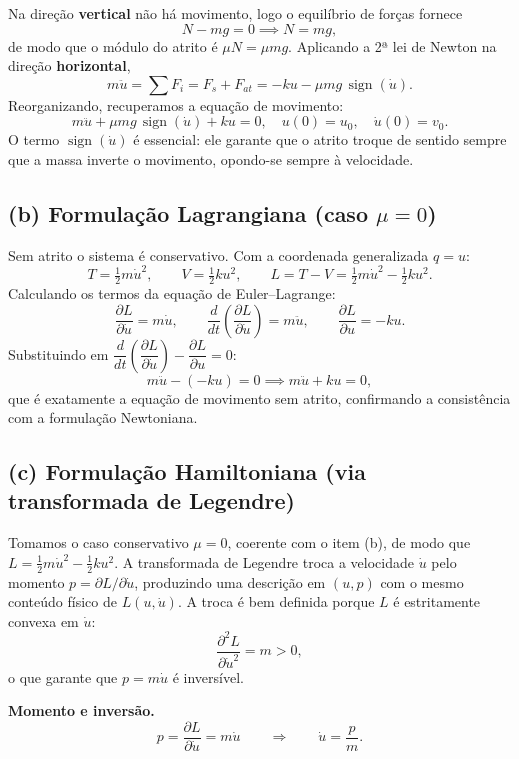 \documentclass{article}
\begin{document}
Na direção \textbf{vertical} não há movimento, logo o equilíbrio de forças fornece
\[ N - mg = 0 \implies N = mg, \]
de modo que o módulo do atrito é $\mu N = \mu m g$. Aplicando a 2ª lei de Newton na direção \textbf{horizontal},
\[ m\ddot{u} = \sum F_i = F_s + F_{at} = -ku - \mu m g\, \operatorname{sign}(\dot{u}). \]
Reorganizando, recuperamos a equação de movimento:
\[ m\ddot{u} + \mu m g\, \operatorname{sign}(\dot{u}) + k u = 0, \quad u(0) = u_0, \quad \dot{u}(0) = v_0. \]
O termo $\operatorname{sign}(\dot{u})$ é essencial: ele garante que o atrito troque de sentido sempre que a massa inverte o movimento, opondo-se sempre à velocidade.

\subsection*{(b) Formulação Lagrangiana (caso $\mu = 0$)}

Sem atrito o sistema é conservativo. Com a coordenada generalizada $q = u$:
\[ T = \tfrac{1}{2} m \dot{u}^2, \qquad V = \tfrac{1}{2} k u^2, \qquad L = T - V = \tfrac{1}{2} m \dot{u}^2 - \tfrac{1}{2} k u^2. \]
Calculando os termos da equação de Euler--Lagrange:
\[ \frac{\partial L}{\partial \dot{u}} = m\dot{u}, \qquad \frac{d}{dt}\!\left( \frac{\partial L}{\partial \dot{u}} \right) = m\ddot{u}, \qquad \frac{\partial L}{\partial u} = -ku. \]
Substituindo em $\dfrac{d}{dt}\!\left( \dfrac{\partial L}{\partial \dot{u}} \right) - \dfrac{\partial L}{\partial u} = 0$:
\[ m\ddot{u} - (-ku) = 0 \implies m\ddot{u} + k u = 0, \]
que é exatamente a equação de movimento sem atrito, confirmando a consistência com a formulação Newtoniana.

\subsection*{(c) Formulação Hamiltoniana (via transformada de Legendre)}

Tomamos o caso conservativo $\mu = 0$, coerente com o item (b), de modo que
$L = \tfrac{1}{2}m\dot u^2 - \tfrac{1}{2}ku^2$. A transformada de Legendre troca a
velocidade $\dot u$ pelo momento $p = \partial L/\partial \dot u$, produzindo uma
descrição em $(u,p)$ com o mesmo conteúdo físico de $L(u,\dot u)$. A troca é bem
definida porque $L$ é estritamente convexa em $\dot u$:
\[
\frac{\partial^2 L}{\partial \dot u^2} = m > 0,
\]
o que garante que $p = m\dot u$ é inversível.

\textbf{Momento e inversão.}
\[
p = \frac{\partial L}{\partial \dot u} = m\dot u
\qquad\Longrightarrow\qquad
\dot u = \frac{p}{m}.
\]
\end{document}
